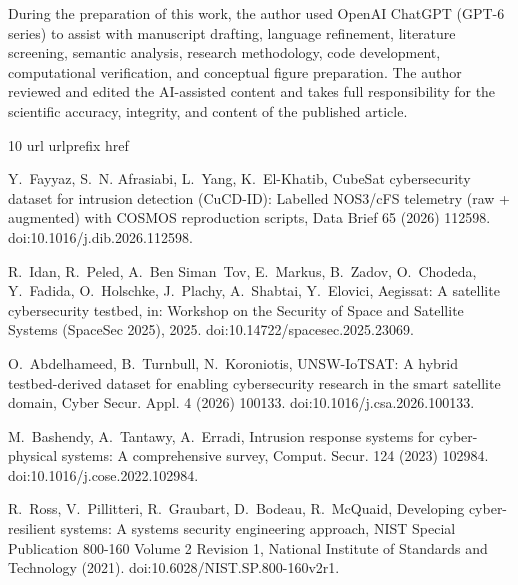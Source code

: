 \documentclass[preprint,12pt]{elsarticle}
\begin{document}
During the preparation of this work, the author used OpenAI ChatGPT (GPT-6 series) to assist with manuscript drafting, language refinement, literature screening, semantic analysis, research methodology, code development, computational verification, and conceptual figure preparation. The author reviewed and edited the AI-assisted content and takes full responsibility for the scientific accuracy, integrity, and content of the published article.

\begin{thebibliography}{10}
\expandafter\ifx\csname url\endcsname\relax
  \def\url#1{\texttt{#1}}\fi
\expandafter\ifx\csname urlprefix\endcsname\relax\def\urlprefix{URL }\fi
\expandafter\ifx\csname href\endcsname\relax
  \def\href#1#2{#2} \def\path#1{#1}\fi

Y.~Fayyaz, S.~N. Afrasiabi, L.~Yang, K.~El-Khatib, {CubeSat} cybersecurity
  dataset for intrusion detection ({CuCD-ID}): Labelled {NOS3/cFS} telemetry
  (raw + augmented) with {COSMOS} reproduction scripts, Data Brief 65 (2026)
  112598.
\newblock \href {https://doi.org/10.1016/j.dib.2026.112598}
  {\path{doi:10.1016/j.dib.2026.112598}}.

R.~Idan, R.~Peled, A.~Ben Siman~Tov, E.~Markus, B.~Zadov, O.~Chodeda,
  Y.~Fadida, O.~Holschke, J.~Plachy, A.~Shabtai, Y.~Elovici, Aegissat: A
  satellite cybersecurity testbed, in: Workshop on the Security of Space and
  Satellite Systems (SpaceSec 2025), 2025.
\newblock \href {https://doi.org/10.14722/spacesec.2025.23069}
  {\path{doi:10.14722/spacesec.2025.23069}}.

O.~Abdelhameed, B.~Turnbull, N.~Koroniotis, {UNSW-IoTSAT}: A hybrid
  testbed-derived dataset for enabling cybersecurity research in the smart
  satellite domain, Cyber Secur. Appl. 4 (2026) 100133.
\newblock \href {https://doi.org/10.1016/j.csa.2026.100133}
  {\path{doi:10.1016/j.csa.2026.100133}}.

M.~Bashendy, A.~Tantawy, A.~Erradi, Intrusion response systems for
  cyber-physical systems: A comprehensive survey, Comput. Secur. 124 (2023)
  102984.
\newblock \href {https://doi.org/10.1016/j.cose.2022.102984}
  {\path{doi:10.1016/j.cose.2022.102984}}.

R.~Ross, V.~Pillitteri, R.~Graubart, D.~Bodeau, R.~McQuaid, Developing
  cyber-resilient systems: A systems security engineering approach, NIST
  Special Publication 800-160 Volume 2 Revision 1, National Institute of
  Standards and Technology (2021).
\newblock \href {https://doi.org/10.6028/NIST.SP.800-160v2r1}
  {\path{doi:10.6028/NIST.SP.800-160v2r1}}.


\end{thebibliography}
\end{document}
